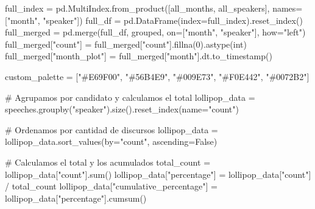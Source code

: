 \documentclass[
  letterpaper,
  DIV=11,
  numbers=noendperiod]{scrartcl}
\newenvironment{Shaded}{\begin{snugshade}}{\end{snugshade}}
\newcommand{\BuiltInTok}[1]{\textcolor[rgb]{0.00,0.23,0.31}{#1}}
\newcommand{\CommentTok}[1]{\textcolor[rgb]{0.37,0.37,0.37}{#1}}
\newcommand{\DecValTok}[1]{\textcolor[rgb]{0.68,0.00,0.00}{#1}}
\newcommand{\NormalTok}[1]{\textcolor[rgb]{0.00,0.23,0.31}{#1}}
\newcommand{\OperatorTok}[1]{\textcolor[rgb]{0.37,0.37,0.37}{#1}}
\newcommand{\StringTok}[1]{\textcolor[rgb]{0.13,0.47,0.30}{#1}}
\newcommand{\VariableTok}[1]{\textcolor[rgb]{0.07,0.07,0.07}{#1}}
\begin{document}
\begin{Shaded}
\begin{Highlighting}[]
\NormalTok{full\_index }\OperatorTok{=}\NormalTok{ pd.MultiIndex.from\_product([all\_months, all\_speakers], names}\OperatorTok{=}\NormalTok{[}\StringTok{"month"}\NormalTok{, }\StringTok{"speaker"}\NormalTok{])}
\NormalTok{full\_df }\OperatorTok{=}\NormalTok{ pd.DataFrame(index}\OperatorTok{=}\NormalTok{full\_index).reset\_index()}
\NormalTok{full\_merged }\OperatorTok{=}\NormalTok{ pd.merge(full\_df, grouped, on}\OperatorTok{=}\NormalTok{[}\StringTok{"month"}\NormalTok{, }\StringTok{"speaker"}\NormalTok{], how}\OperatorTok{=}\StringTok{"left"}\NormalTok{)}
\NormalTok{full\_merged[}\StringTok{"count"}\NormalTok{] }\OperatorTok{=}\NormalTok{ full\_merged[}\StringTok{"count"}\NormalTok{].fillna(}\DecValTok{0}\NormalTok{).astype(}\BuiltInTok{int}\NormalTok{)}
\NormalTok{full\_merged[}\StringTok{"month\_plot"}\NormalTok{] }\OperatorTok{=}\NormalTok{ full\_merged[}\StringTok{"month"}\NormalTok{].dt.to\_timestamp()}

\NormalTok{custom\_palette }\OperatorTok{=}\NormalTok{ [}\StringTok{"\#E69F00"}\NormalTok{, }\StringTok{"\#56B4E9"}\NormalTok{, }\StringTok{"\#009E73"}\NormalTok{, }\StringTok{"\#F0E442"}\NormalTok{, }\StringTok{"\#0072B2"}\NormalTok{]}



\CommentTok{\# Agrupamos por candidato y calculamos el total}
\NormalTok{lollipop\_data }\OperatorTok{=}\NormalTok{ speeches.groupby(}\StringTok{"speaker"}\NormalTok{).size().reset\_index(name}\OperatorTok{=}\StringTok{"count"}\NormalTok{)}

\CommentTok{\# Ordenamos por cantidad de discursos}
\NormalTok{lollipop\_data }\OperatorTok{=}\NormalTok{ lollipop\_data.sort\_values(by}\OperatorTok{=}\StringTok{"count"}\NormalTok{, ascending}\OperatorTok{=}\VariableTok{False}\NormalTok{)}

\CommentTok{\# Calculamos el total y los acumulados}
\NormalTok{total\_count }\OperatorTok{=}\NormalTok{ lollipop\_data[}\StringTok{"count"}\NormalTok{].}\BuiltInTok{sum}\NormalTok{()}
\NormalTok{lollipop\_data[}\StringTok{"percentage"}\NormalTok{] }\OperatorTok{=}\NormalTok{ lollipop\_data[}\StringTok{"count"}\NormalTok{] }\OperatorTok{/}\NormalTok{ total\_count}
\NormalTok{lollipop\_data[}\StringTok{"cumulative\_percentage"}\NormalTok{] }\OperatorTok{=}\NormalTok{ lollipop\_data[}\StringTok{"percentage"}\NormalTok{].cumsum()}


\end{Highlighting}
\end{Shaded}
\end{document}

